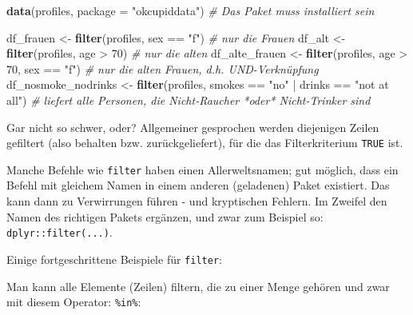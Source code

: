 \documentclass[12pt,]{book}
\newenvironment{Shaded}{\begin{snugshade}}{\end{snugshade}}
\newcommand{\KeywordTok}[1]{\textcolor[rgb]{0.13,0.29,0.53}{\textbf{{#1}}}}
\newcommand{\DataTypeTok}[1]{\textcolor[rgb]{0.13,0.29,0.53}{{#1}}}
\newcommand{\DecValTok}[1]{\textcolor[rgb]{0.00,0.00,0.81}{{#1}}}
\newcommand{\StringTok}[1]{\textcolor[rgb]{0.31,0.60,0.02}{{#1}}}
\newcommand{\CommentTok}[1]{\textcolor[rgb]{0.56,0.35,0.01}{\textit{{#1}}}}
\newcommand{\NormalTok}[1]{{#1}}
\let\BeginKnitrBlock\begin \let\EndKnitrBlock\end
\begin{document}
\begin{Shaded}
\begin{Highlighting}[]
\KeywordTok{data}\NormalTok{(profiles, }\DataTypeTok{package =} \StringTok{"okcupiddata"}\NormalTok{)  }\CommentTok{# Das Paket muss installiert sein}
\end{Highlighting}
\end{Shaded}

\begin{Shaded}
\begin{Highlighting}[]
\NormalTok{df_frauen <-}\StringTok{ }\KeywordTok{filter}\NormalTok{(profiles, sex ==}\StringTok{ "f"}\NormalTok{)  }\CommentTok{# nur die Frauen}
\NormalTok{df_alt <-}\StringTok{ }\KeywordTok{filter}\NormalTok{(profiles, age >}\StringTok{ }\DecValTok{70}\NormalTok{)  }\CommentTok{# nur die alten}
\NormalTok{df_alte_frauen <-}\StringTok{ }\KeywordTok{filter}\NormalTok{(profiles, age >}\StringTok{ }\DecValTok{70}\NormalTok{, sex ==}\StringTok{ "f"}\NormalTok{)  }\CommentTok{# nur die alten Frauen, d.h. UND-Verknüpfung}
\NormalTok{df_nosmoke_nodrinks <-}\StringTok{ }\KeywordTok{filter}\NormalTok{(profiles, smokes ==}\StringTok{ "no"} \NormalTok{|}\StringTok{ }\NormalTok{drinks ==}\StringTok{ "not at all"}\NormalTok{) }
\CommentTok{# liefert alle Personen, die Nicht-Raucher *oder* Nicht-Trinker sind}
\end{Highlighting}
\end{Shaded}

Gar nicht so schwer, oder? Allgemeiner gesprochen werden diejenigen
Zeilen gefiltert (also behalten bzw. zurückgeliefert), für die das
Filterkriterium \texttt{TRUE} ist.

\BeginKnitrBlock{rmdcaution}
Manche Befehle wie \texttt{filter} haben einen Allerweltsnamen; gut
möglich, dass ein Befehl mit gleichem Namen in einem anderen (geladenen)
Paket existiert. Das kann dann zu Verwirrungen führen - und kryptischen
Fehlern. Im Zweifel den Namen des richtigen Pakets ergänzen, und zwar
zum Beispiel so: \texttt{dplyr::filter(...)}.
\EndKnitrBlock{rmdcaution}

Einige fortgeschrittene Beispiele für \texttt{filter}:

Man kann alle Elemente (Zeilen) filtern, die zu einer Menge gehören und
zwar mit diesem Operator: \texttt{\%in\%}:

\begin{Shaded}
\end{Shaded}
\end{document}

